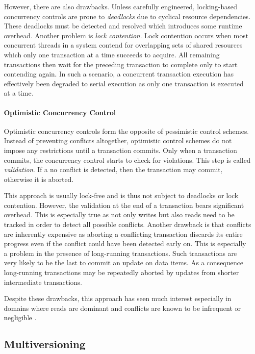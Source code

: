 However, there are also drawbacks. Unless carefully engineered, locking-based
concurrency controls are prone to \emph{deadlocks} due to cyclical resource
dependencies. These deadlocks must be detected and resolved which introduces
some runtime overhead. Another problem is \emph{lock contention}. Lock
contention occurs when most concurrent threads in a system contend for
overlapping sets of shared resources which only one transaction at a time
succeeds to acquire. All remaining transactions then wait for the preceding
transaction to complete only to start contending again. In such a scenario, a
concurrent transaction execution has effectively been degraded to serial
execution as only one transaction is executed at a time.

\paragraph{Optimistic Concurrency Control} %
Optimistic concurrency controls form the opposite of pessimistic control
schemes. Instead of preventing conflicts altogether, optimistic control schemes
do not impose any restrictions until a transaction commits. Only when a
transaction commits, the concurrency control starts to check for violations.
This step is called \emph{validation}. If a no conflict is detected, then the
transaction may commit, otherwise it is aborted.

This approach is usually lock-free and is thus not subject to deadlocks or lock
contention. However, the validation at the end of a transaction bears
significant overhead. This is especially true as not only writes but also reads
need to be tracked in order to detect all possible conflicts. Another drawback
is that conflicts are inherently expensive as aborting a conflicting transaction
discards its entire progress even if the conflict could have been detected early
on. This is especially a problem in the presence of long-running transactions.
Such transactions are very likely to be the last to commit an update on data
items. As a consequence long-running transactions may be repeatedly aborted by
updates from shorter intermediate transactions.

Despite these drawbacks, this approach has seen much interest especially in
domains where reads are dominant and conflicts are known to be infrequent or
negligible \cite{kung1981optimistic, carey1986performance, larson2011high}.

\subsection{Multiversioning}


